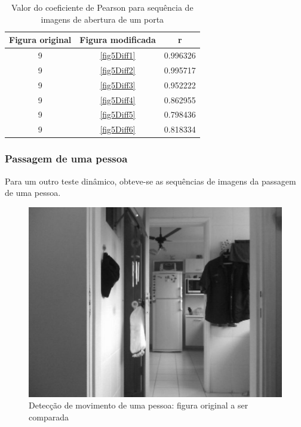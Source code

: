 \documentclass[10pt,a4paper]{article}
\begin{document}
\vspace{-0.5cm}
\begin{table}[h!]
  \begin{center}
    \caption{Valor do coeficiente de Pearson para sequência de imagens
      de abertura de um porta}
    \begin{tabular}{|c|c|c|}
      \hline
      Figura original & Figura modificada & r\\
      \hline
      9 &  \ref{fig5Diff1} & 0.996326\\
      9 &  \ref{fig5Diff2} & 0.995717\\
      9 &  \ref{fig5Diff3} & 0.952222\\
      9 &  \ref{fig5Diff4} & 0.862955\\
     9 &  \ref{fig5Diff5} & 0.798436\\
      9 &  \ref{fig5Diff6} & 0.818334\\
      \hline
    \end{tabular}
  \end{center}
\end{table}


\newpage
\subsubsection{Passagem de uma pessoa}
Para um outro teste dinâmico, obteve-se as sequências de imagens da
passagem de uma pessoa.

\begin{figure}[h!]
  \begin{center}
    \includegraphics[scale=0.35]{photos/pessoa/gBase}
    \caption{Detecção de movimento de uma pessoa: figura original a ser comparada}
  \end{center}
  \label{pessoa}
\end{figure}
\end{document}
